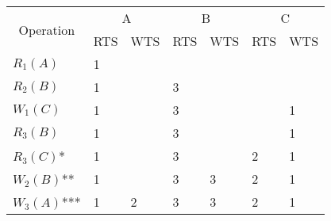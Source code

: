 \documentclass{article}
\begin{document}
\begin{enumerate}
\begin{enumerate}
        \begin{center}
            \begin{longtable}{|p{2cm}|p{1.5cm}|p{1.5cm}|p{1.5cm}|p{1.5cm}|p{1.5cm}|p{1.5cm}|}
                \hline
                \multicolumn{1}{|c|}{\multirow{2}{*}{Operation}} & \multicolumn{2}{c|}{A} & \multicolumn{2}{c|}{B} & \multicolumn{2}{c|}{C} \\
                \multicolumn{1}{|c|}{} & \multicolumn{1}{c}{RTS} & \multicolumn{1}{c|}{WTS} & \multicolumn{1}{c}{RTS} & \multicolumn{1}{c|}{WTS} & \multicolumn{1}{c}{RTS} & \multicolumn{1}{c|}{WTS} \\ 
                \hline
                \multirow{2}{*}{$R_1(A)$} & \multirow{2}{*}{1} & \multirow{2}{*}{} & \multirow{2}{*}{} & \multirow{2}{*}{} & \multirow{2}{*}{} & \multirow{2}{*}{} \\
                 & & & & & & \\
                \hline 
                \multirow{2}{*}{$R_2(B)$} & \multirow{2}{*}{1} & \multirow{2}{*}{} & \multirow{2}{*}{3} & \multirow{2}{*}{} & \multirow{2}{*}{} & \multirow{2}{*}{} \\
                 & & & & & & \\
                \hline 
                \multirow{2}{*}{$W_1(C)$} & \multirow{2}{*}{1} & \multirow{2}{*}{} & \multirow{2}{*}{3} & \multirow{2}{*}{} & \multirow{2}{*}{} & \multirow{2}{*}{1} \\
                 & & & & & & \\
                \hline 
                \multirow{2}{*}{$R_3(B)$} & \multirow{2}{*}{1} & \multirow{2}{*}{} & \multirow{2}{*}{3} & \multirow{2}{*}{} & \multirow{2}{*}{} & \multirow{2}{*}{1} \\
                 & & & & & & \\
                \hline 
                \multirow{2}{*}{$R_3(C)$*} & \multirow{2}{*}{1} & \multirow{2}{*}{} & \multirow{2}{*}{3} & \multirow{2}{*}{} & \multirow{2}{*}{2} & \multirow{2}{*}{1} \\
                 & & & & & & \\
                \hline 
                \multirow{2}{*}{$W_2(B)$**} & \multirow{2}{*}{1} & \multirow{2}{*}{} & \multirow{2}{*}{3} & \multirow{2}{*}{3} & \multirow{2}{*}{2} & \multirow{2}{*}{1} \\
                 & & & & & & \\
                \hline 
                \multirow{2}{*}{$W_3(A)$***} & \multirow{2}{*}{1} & \multirow{2}{*}{2} & \multirow{2}{*}{3} & \multirow{2}{*}{3} & \multirow{2}{*}{2} & \multirow{2}{*}{1} \\

\end{longtable}
\end{center}
\end{enumerate}
\end{enumerate}
\end{document}
